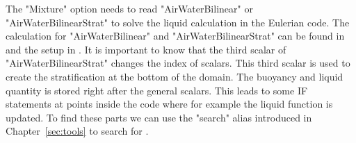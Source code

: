 \documentclass[12pt]{article}
\begin{document}
The "Mixture" option needs to read "AirWaterBilinear" or "AirWaterBilinearStrat" to solve the liquid calculation in the Eulerian code. The calculation for "AirWaterBilinear" and "AirWaterBilinearStrat" can be found in  and the setup in . It is important to know that the third scalar of "AirWaterBilinearStrat" changes the index of scalars. This third scalar is used to create the stratification at the bottom of the domain. The buoyancy and liquid quantity is stored right after the general scalars. This leads to some IF statements at points inside the code where for example the liquid function is updated. To find these parts we can use the "search" alias introduced in Chapter~\ref{sec:tools} to search for .
\begin{table}
    \caption{Setup variables for the particle properties. They are initialized in "modules/lagrange\_global.f90" and "modules/dns\_global.f90"}
    \label{tab:setup_particles}
\end{table}
\end{document}
